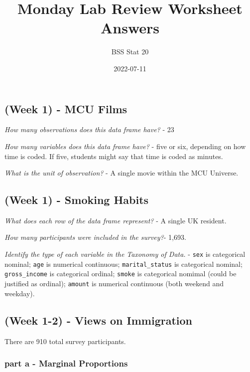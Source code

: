 \documentclass[
]{article}
\title{Monday Lab Review Worksheet Answers}
\author{BSS Stat 20}
\date{2022-07-11}
\begin{document}
\maketitle

\hypertarget{week-1---mcu-films}{%
\subsection{(Week 1) - MCU Films}\label{week-1---mcu-films}}

\emph{How many observations does this data frame have?} - 23

\emph{How many variables does this data frame have?} - five or six,
depending on how time is coded. If five, students might say that time is
coded as minutes.

\emph{What is the unit of observation?} - A single movie within the MCU
Universe.

\hypertarget{week-1---smoking-habits}{%
\subsection{(Week 1) - Smoking Habits}\label{week-1---smoking-habits}}

\emph{What does each row of the data frame represent?} - A single UK
resident.

\emph{How many participants were included in the survey?}- 1,693.

\emph{Identify the type of each variable in the Taxonomy of Data.} -
\texttt{sex} is categorical nominal; \texttt{age} is numerical
continuous; \texttt{marital\_status} is categorical nominal;
\texttt{gross\_income} is categorical ordinal; \texttt{smoke} is
categorical nomimal (could be justified as ordinal); \texttt{amount} is
numerical continuous (both weekend and weekday).

\hypertarget{week-1-2---views-on-immigration}{%
\subsection{(Week 1-2) - Views on
Immigration}\label{week-1-2---views-on-immigration}}

There are 910 total survey participants.

\hypertarget{part-a---marginal-proportions}{%
\subsubsection{\texorpdfstring{part a - \textbf{Marginal
Proportions}}{part a - Marginal Proportions}}\label{part-a---marginal-proportions}}
\end{document}
